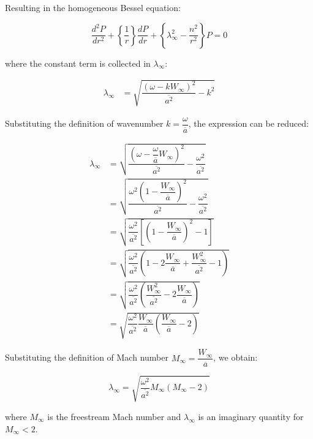 \documentclass[]{aiaa-tc}%
\begin{document}
Resulting in the homogeneous Bessel equation:

\begin{equation} \label{BesselEqn}
\boxed{ \dfrac{d^2P}{dr^2} + \left\{ \dfrac{1}{r} \right\} \dfrac{dP}{dr}
      + \left\{ \lambda_{\infty}^2 - \dfrac{n^2}{r^2} \right\} P = 0 }
\end{equation}

\noindent where the constant term is collected in $\lambda_{\infty}$:

\begin{align*}
\lambda_{\infty} &= \sqrt{\dfrac{(\omega - k W_{\infty} )^2}{\overline{a^2} } - k^2}
\end{align*}

Substituting the definition of wavenumber $k=\dfrac{\omega}{\overline{a}}$, the expression can be reduced:

\begin{align*}
\lambda_{\infty} &= \sqrt{
  \dfrac{ \left(\omega -\dfrac{\omega}{\overline{a}} W_{\infty} \right)^2}{\overline{a^2}}
  - \dfrac{\omega^2}{\overline{a^2}}
  } \\
&= \sqrt{
  \dfrac{ \omega^2 \left(1 -\dfrac{W_{\infty}}{\overline{a}} \right)^2}{\overline{a^2}}
  - \dfrac{\omega^2}{\overline{a^2}}
  } \\
&= \sqrt{ \dfrac{\omega^2}{\overline{a^2}}
    \left[ \left(1 -\dfrac{W_{\infty}}{\overline{a}} \right)^2 - 1  \right]
  } \\
&= \sqrt{ \dfrac{\omega^2}{\overline{a^2}}
    \left( 1 -2\dfrac{W_{\infty}}{\overline{a}} + \dfrac{W_{\infty}^2}{\overline{a^2}} - 1  \right) } \\
&= \sqrt{ \dfrac{\omega^2}{\overline{a^2}}
    \left( \dfrac{W_{\infty}^2}{\overline{a^2}} -2\dfrac{W_{\infty}}{\overline{a}} \right) } \\
&= \sqrt{ \dfrac{\omega^2}{\overline{a^2}} \dfrac{W_{\infty}}{\overline{a}}
    \left( \dfrac{W_{\infty}}{\overline{a}} - 2 \right) }
\end{align*}

Substituting the definition of Mach number $M_{\infty} = \dfrac{W_{\infty}}{\overline{a}}$, we obtain:

\begin{equation} \label{lambda}
\lambda_{\infty} = \sqrt{ \dfrac{\omega^2}{\overline{a^2}} M_{\infty} ( M_{\infty} - 2 ) }
\end{equation}

\noindent where $M_{\infty}$ is the freestream Mach number and $\lambda_{\infty}$ is an imaginary quantity for $M_{\infty} < 2$.
\end{document}
